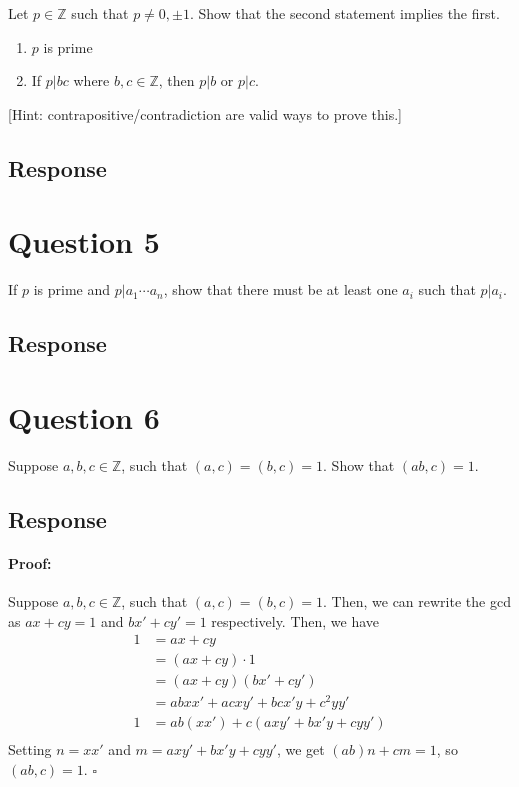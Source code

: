 \documentclass [12pt] {article}
\newcommand{\Z}{\mathbb{Z}}
\newenvironment{proof}{\paragraph{Proof:}}{\hfill$\square$}
\begin{document}
Let $p\in\Z$ such that $p\neq 0,\pm1$. Show that the second statement implies the first.
	\begin{enumerate}
        \item $p$ is prime 
		\item If $p|bc$ where $b,c\in\Z$, then $p|b$ or $p|c$.
	\end{enumerate}

[Hint: contrapositive/contradiction are valid ways to prove this.]

\subsection*{Response}
\newpage

\section*{Question 5}
If $p$ is prime and $p|a_1\cdots a_n$, show that there must be at least one $a_i$ such that $p|a_i$. 
\subsection*{Response}
\newpage

\section*{Question 6}
Suppose $a,b,c\in\Z$, such that $(a,c)=(b,c)=1$. Show that $(ab,c)=1$. 

\subsection*{Response}
\begin{proof}
Suppose $a, b, c \in \Z$, such that $(a, c) = (b, c) = 1$. Then, we can rewrite the gcd as
$ax + cy = 1$ and $bx' + cy' = 1$ respectively. Then, we have
\begin{align*}
    1 &= ax + cy  \\
      &= (ax + cy) \cdot 1  \\
      &= (ax + cy)(bx' + cy') \\
      &= abxx' + acxy' + bcx'y + c^2yy' \\
    1 &= ab(xx') + c(axy' + bx'y + cyy') \\
\end{align*}
Setting $n = xx'$ and $m = axy' + bx'y + cyy'$, we get $(ab)n + cm = 1$, so $(ab, c) = 1$.
\end{proof}
\newpage
\end{document}
